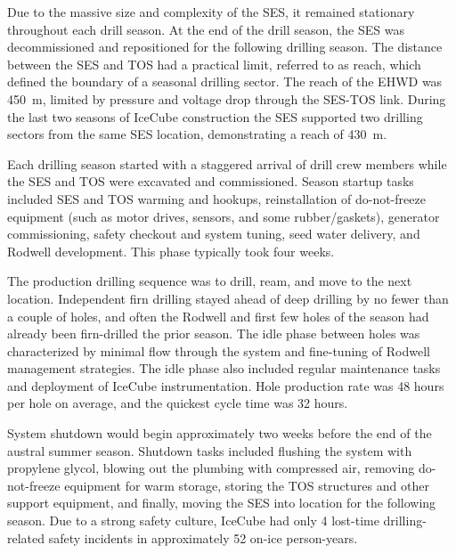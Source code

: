 Due to the massive size and complexity of the SES, it remained stationary
throughout each drill season.  At the end of the drill season, the SES was
decommissioned and repositioned for the following drilling season.  The
distance between the SES and TOS had a practical limit, referred to as
reach, which defined the boundary of a seasonal drilling sector.  The reach
of the EHWD was 450~m, limited by pressure and voltage drop through the
SES-TOS link.  During the last two seasons of IceCube construction the SES
supported two drilling sectors from the same SES location, demonstrating a
reach of 430~m.

Each drilling season started with a staggered arrival of drill crew members
while the SES and TOS were excavated and commissioned.  Season startup
tasks included SES and TOS warming and hookups, reinstallation of
do-not-freeze equipment (such as motor drives, sensors, and some
rubber/gaskets), generator commissioning, safety checkout and system
tuning, seed water delivery, and Rodwell development.  This phase typically
took four weeks.

The production drilling sequence was to drill, ream, and move to the next
location.  Independent firn drilling stayed ahead of deep drilling by no
fewer than a couple of holes, and often the Rodwell and first few holes of
the season had already been firn-drilled the prior season.  The idle phase
between holes was characterized by minimal flow through the
system and fine-tuning of Rodwell management strategies.  The idle phase
also included regular maintenance tasks and deployment of IceCube
instrumentation.  Hole production rate was 48 hours per hole on average,
and the quickest cycle time was 32 hours.

System shutdown would begin approximately two weeks before the end of the
austral summer season. Shutdown tasks included flushing the system with
propylene glycol, blowing out the plumbing with compressed air, removing
do-not-freeze equipment for warm storage, storing the TOS structures and
other support equipment, and finally, moving the SES into location for the
following season.  Due to a strong safety culture, IceCube had only 4
lost-time drilling-related safety incidents in approximately 52 on-ice 
person-years. 


